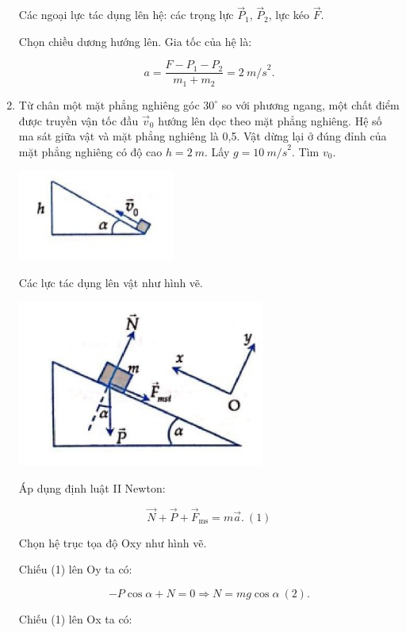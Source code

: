 \begin{enumerate}[label=\bfseries Câu \arabic*:]
	\hideall
	{
		Các ngoại lực tác dụng lên hệ: các trọng lực $\vec P_1$, $\vec P_2$, lực kéo $\vec F$.
		
		Chọn chiều dương hướng lên. Gia tốc của hệ là:
		
		$$a = \dfrac{F - P_1 - P_2}{m_1 + m_2} = \SI{2}{m/s}^2.$$
	}
	\item {}
	
	
	{
		Từ chân một mặt phẳng nghiêng góc $30^\circ$ so với phương ngang, một chất điểm được truyền vận tốc đầu $\vec v_0$ hướng lên dọc theo mặt phẳng nghiêng. Hệ số ma sát giữa vật và mặt phẳng nghiêng là 0,5. Vật dừng lại ở đúng đỉnh của mặt phẳng nghiêng có độ cao $h =\SI{2}{m}.$ Lấy $ g = \SI{10}{m/s}^2$. Tìm $v_0$.
		
		\begin{center}
			\includegraphics[scale=1]{../figs/VN10-2022-PH-TP021-9.jpg}
		\end{center}
	}
	
	\hideall
	{
		
		Các lực tác dụng lên vật như hình vẽ.
		\begin{center}
			\includegraphics[scale=1]{../figs/VN10-2022-PH-TP021-10.jpg}
		\end{center}
		Áp dụng định luật II Newton:
		
		$$\vec N + \vec P + \vec F_\text{ms} = m\vec a.\ (1)$$
		
		Chọn hệ trục tọa độ Oxy như hình vẽ.
		
		Chiếu (1) lên Oy ta có:
		
		$$ - P \cos \alpha + N =0 \Rightarrow N = mg \cos \alpha\ (2).$$
		
		Chiếu (1) lên Ox ta có: 
		
}
\end{enumerate}
